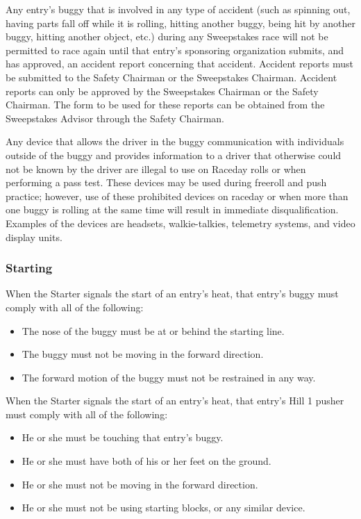 	Any entry's buggy that is involved in any type of accident (such as spinning
	out, having parts fall off while it is rolling, hitting another buggy, being
	hit by another buggy, hitting another object, etc.) during any Sweepstakes race
	will not be permitted to race again until that entry's sponsoring organization
	submits, and has approved, an accident report concerning that accident.
	Accident reports must be submitted to the Safety Chairman or the Sweepstakes
	Chairman. Accident reports can only be approved by the Sweepstakes Chairman or
	the Safety Chairman. The form to be used for these reports can be obtained from
	the Sweepstakes Advisor through the Safety Chairman.

	Any device that allows the driver in the buggy communication with individuals
	outside of the buggy and provides information to a driver that otherwise could
	not be known by the driver are illegal to use on Raceday rolls or when
	performing a pass test. These devices may be used during freeroll and push
	practice; however, use of these prohibited devices on raceday or when more than
	one buggy is rolling at the same time will result in immediate
	disqualification. Examples of the devices are headsets, walkie-talkies,
	telemetry systems, and video display units.

\subsubsection{Starting}

	When the Starter signals the start of an entry's heat, that entry's buggy must
	comply with all of the following:

	\begin{itemize}

		\item The nose of the buggy must be at or behind the starting line.

		\item The buggy must not be moving in the forward direction.

		\item The forward motion of the buggy must not be restrained in any way.

	\end{itemize}
	
	\noindent When the Starter signals the start of an entry's heat, that entry's
	Hill 1 pusher must comply with all of the following:

	\begin{itemize}

		\item He or she must be touching that entry's buggy.

		\item He or she must have both of his or her feet on the ground.

		\item He or she must not be moving in the forward direction.

		\item He or she must not be using starting blocks, or any similar device.

	\end{itemize}

